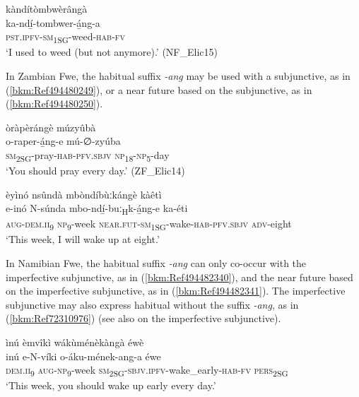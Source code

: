 \ea
\label{bkm:Ref99097044}
\glll kàndítòmbwèrângà\\
ka-ndí̲-tombwer-á̲ng-a\\
\textsc{pst}.\textsc{ipfv}-\textsc{sm}\textsubscript{1SG}-weed-\textsc{hab}-\textsc{fv}\\
\glt ‘I used to weed (but not anymore).’ (NF\_Elic15)
\z

In Zambian Fwe, the habitual suffix \textit{-ang} may be used with a subjunctive, as in (\ref{bkm:Ref494480249}), or a near future based on the subjunctive, as in (\ref{bkm:Ref494480250}).

\ea
\label{bkm:Ref494480249}
òràpèrángè múzyûbà\\
\gll o-raper-á̲ng-e    mú-∅-zyúba\\
\textsc{sm}\textsubscript{2SG}-pray-\textsc{hab}-\textsc{pfv}.\textsc{sbjv}  \textsc{np}\textsubscript{18}-\textsc{np}\textsubscript{5}-day\\
\glt ‘You should pray every day.’ (ZF\_Elic14)
\z

\ea
\label{bkm:Ref494480250}
èyìnó nsûndà mbòndíbùːkángè kàêtì\\
\gll e-inó    N-súnda  mbo-ndí̲-buː\textsubscript{H}k-á̲ng-e      ka-éti\\
\textsc{aug}-\textsc{dem}.\textsc{ii}\textsubscript{9}  \textsc{np}\textsubscript{9}-week  \textsc{near}.\textsc{fut}-\textsc{sm}\textsubscript{1SG}-wake-\textsc{hab}-\textsc{pfv}.\textsc{sbjv}  \textsc{adv}-eight\\
\glt ‘This week, I will wake up at eight.’
\z

In Namibian Fwe, the habitual suffix \textit{-ang} can only co-occur with the imperfective subjunctive, as in (\ref{bkm:Ref494482340}), and the near future based on the imperfective subjunctive, as in (\ref{bkm:Ref494482341}). The imperfective subjunctive may also express habitual without the suffix \textit{-ang}, as in (\ref{bkm:Ref72310976}) (see also  on the imperfective subjunctive).

\ea
\label{bkm:Ref494482340}
ìnú èmvîkì wákùménèkàngà éwè\\
\gll inú    e-N-víki    o-áku-mének-ang-a    éwe\\
\textsc{dem}.\textsc{ii}\textsubscript{9}  \textsc{aug}-\textsc{np}\textsubscript{9}-week  \textsc{sm}\textsubscript{2SG}-\textsc{sbjv}.\textsc{ipfv}-wake\_early-\textsc{hab}-\textsc{fv} \textsc{pers}\textsubscript{2SG}\\
\glt ‘This week, you should wake up early every day.’
\z

